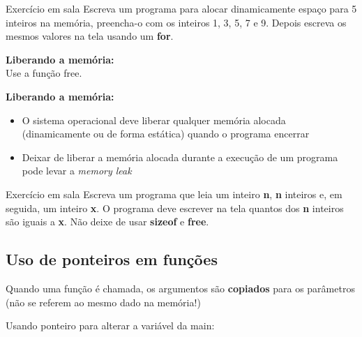 \documentclass[portuguese,10pt,xcolor=table]{bredelebeamer}
\begin{document}
	\begin{frame}
		\begin{alertblock}{ Exercício em sala}
			Escreva um programa para alocar dinamicamente espaço para 5 inteiros na memória, preencha-o com os inteiros 1, 3, 5, 7 e 9. Depois escreva os mesmos valores na tela usando um \textbf{for}.
		\end{alertblock}
	\end{frame}

	\begin{frame} 
		\textbf{Liberando a memória:}\\
				
				Use a função free.
	\end{frame}

	\begin{frame} 
		\textbf{Liberando a memória:}\\
		\begin{itemize}
			\item O sistema operacional deve liberar qualquer memória alocada (dinamicamente ou de forma estática) quando o programa encerrar
			\item Deixar de liberar a memória alocada durante a execução de um programa pode levar a \textit{memory leak}
		\end{itemize}
	\end{frame}
	
	\begin{frame}
		\begin{alertblock}{ Exercício em sala}
			Escreva um programa que leia um inteiro \textbf{n}, \textbf{n} inteiros e, em seguida, um inteiro \textbf{x}. O programa deve escrever na tela quantos dos \textbf{n} inteiros são iguais a \textbf{x}. Não deixe de usar \textbf{sizeof} e \textbf{free}.
		\end{alertblock}
	\end{frame}


	\subsection{Uso de ponteiros em funções}

	\begin{frame}
		\begin{center}
			\structure{\large \insertsubsection}
		\end{center}
	\end{frame} 

	\begin{frame}
		Quando uma função é chamada, os argumentos são \textbf{copiados} para os parâmetros (não se referem ao mesmo dado na memória!)\\
				
	\end{frame}
	
	\begin{frame}
		Usando ponteiro para alterar a variável da main:\\
				
	\end{frame}
	
\end{document}
